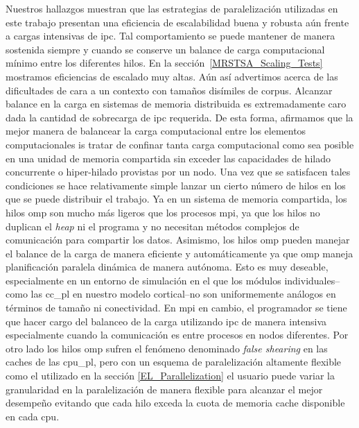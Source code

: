 {Nuestros hallazgos muestran que las estrategias de paralelización utilizadas en este trabajo presentan una eficiencia de escalabilidad buena y robusta aún frente a cargas intensivas de \gls{ipc}.
Tal comportamiento se puede mantener de manera sostenida siempre y cuando se conserve un balance de carga computacional mínimo entre los diferentes hilos.
En la sección~\ref{MRSTSA_Scaling_Tests} mostramos eficiencias de escalado muy altas.
Aún así advertimos acerca de las dificultades de cara a un contexto con tamaños disímiles de corpus.
Alcanzar balance en la carga en sistemas de memoria distribuida es extremadamente caro dada la cantidad de sobrecarga de \gls{ipc} requerida.
De esta forma, afirmamos que la mejor manera de balancear la carga computacional entre los elementos computacionales is tratar de confinar tanta carga computacional como sea posible en una unidad de memoria compartida sin exceder las capacidades de hilado concurrente o hiper-hilado provistas por un nodo.
Una vez que se satisfacen tales condiciones se hace relativamente simple lanzar un cierto número de hilos en los que se puede distribuir el trabajo.
Ya en un sistema de memoria compartida, los hilos \gls{omp} son mucho más ligeros que los procesos \gls{mpi}, ya que los hilos no duplican el \emph{heap} ni el programa y no necesitan métodos complejos de comunicación para compartir los datos.
Asimismo, los hilos \gls{omp} pueden manejar el balance de la carga de manera eficiente y automáticamente ya que \gls{omp} maneja planificación paralela dinámica de manera autónoma.
Esto es muy deseable, especialmente en un entorno de simulación en el que los módulos individuales--como las \gls{cc_pl} en nuestro modelo cortical--no son uniformemente análogos en términos de tamaño ni conectividad.
En \gls{mpi} en cambio, el programador se tiene que hacer cargo del balanceo de la carga utilizando \gls{ipc} de manera intensiva especialmente cuando la comunicación es entre procesos en nodos diferentes.
Por otro lado los hilos \gls{omp} sufren el fenómeno denominado \emph{false shearing} en las caches de las \gls{cpu_pl}, pero con un esquema de paralelización altamente flexible como el utilizado en la sección \ref{EL_Parallelization} el usuario puede variar la granularidad en la paralelización de manera flexible para alcanzar el mejor desempeño evitando que cada hilo exceda la cuota de memoria cache disponible en cada \gls{cpu}.

}
